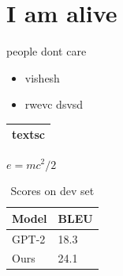 \documentclass[11pt,a4paper]{article}
\begin{document}
\section{I am alive}

people dont care

\begin{itemize}
  \item vishesh
  \item rwevc dsvsd
\end{itemize}

\begin{table}[!t]
\centering
\begin{tabular}{l}
\hline
textsc \\
\hline

\hline
\end{tabular}
\end{table}

$e=mc^2/2$

\begin{table}[!t]
\centering
\begin{tabular}{ll}
\hline
Model & BLEU \\
\hline
GPT-2 & 18.3 \\
Ours & 24.1 \\
\hline
\end{tabular}
\caption{Scores on dev set}
\label{tbl:mytable}
\end{table}


\end{document}
